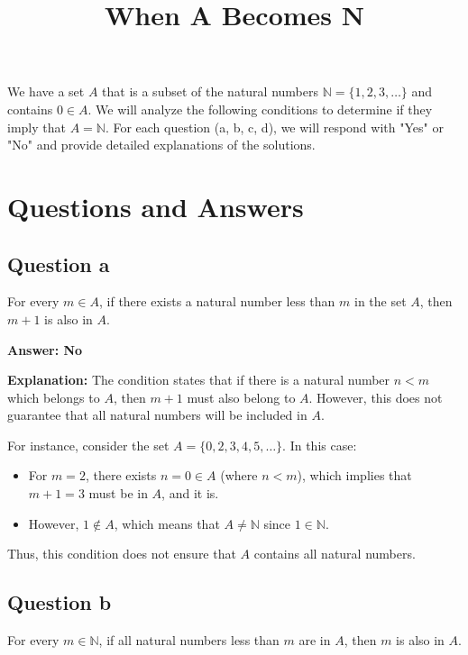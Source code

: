 \documentclass{article}
\begin{document}
\title{When A Becomes N}
\author{}
\date{}
\maketitle

We have a set \( A \) that is a subset of the natural numbers \( \mathbb{N} = \{1, 2, 3, \ldots\} \) and contains \( 0 \in A \). We will analyze the following conditions to determine if they imply that \( A = \mathbb{N} \). For each question (a, b, c, d), we will respond with "Yes" or "No" and provide detailed explanations of the solutions.

\section*{Questions and Answers}

\subsection*{Question a}
For every \( m \in A \), if there exists a natural number less than \( m \) in the set \( A \), then \( m + 1 \) is also in \( A \).

\textbf{Answer: No}

\textbf{Explanation:} The condition states that if there is a natural number \( n < m \) which belongs to \( A \), then \( m + 1 \) must also belong to \( A \). However, this does not guarantee that all natural numbers will be included in \( A \).

For instance, consider the set \( A = \{0, 2, 3, 4, 5, \ldots\} \). In this case:
\begin{itemize}
    \item For \( m = 2 \), there exists \( n = 0 \in A \) (where \( n < m \)), which implies that \( m + 1 = 3 \) must be in \( A \), and it is.
    \item However, \( 1 \notin A \), which means that \( A \neq \mathbb{N} \) since \( 1 \in \mathbb{N} \).
\end{itemize}

Thus, this condition does not ensure that \( A \) contains all natural numbers.

\subsection*{Question b}
For every \( m \in \mathbb{N} \), if all natural numbers less than \( m \) are in \( A \), then \( m \) is also in \( A \).
\end{document}
